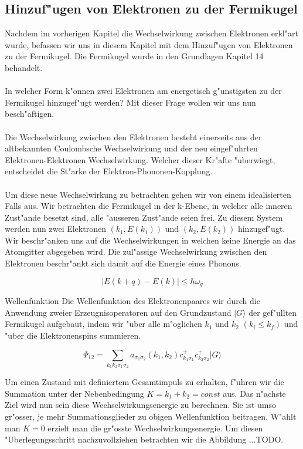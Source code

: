 \begin{refsection}
\section{Hinzuf"ugen von Elektronen zu der Fermikugel}
Nachdem im vorherigen Kapitel die Wechselwirkung zwischen Elektronen erkl"art wurde, befassen wir uns in diesem Kapitel mit dem Hinzuf"ugen von Elektronen zu der Fermikugel. Die Fermikugel wurde in den Grundlagen Kapitel 14 behandelt.
\\
\\
In welcher Form k"onnen zwei Elektronen am energetisch g"unstigsten zu der Fermikugel hinzugef"ugt werden? Mit dieser Frage wollen wir uns nun besch"aftigen.
\\
\\
Die Wechselwirkung zwischen den Elektronen besteht einerseits aus der altbekannten Coulombsche Wechselwirkung und der neu eingef"uhrten Elektronen-Elektronen Wechselwirkung. Welcher dieser Kr"afte "uberwiegt, entscheidet die St"arke der Elektron-Phononen-Kopplung.
\\
\\
Um diese neue Wechselwirkung zu betrachten gehen wir von einem idealisierten Falls aus. Wir betrachten die Fermikugel in der k-Ebene, in welcher alle inneren Zust"ande besetzt sind, alle "ausseren Zust"ande seien frei. Zu diesem System werden nun zwei Elektronen $(k_1,E(k_1))$ und $(k_2,E(k_2))$ hinzugef"ugt. Wir beschr"anken uns auf die Wechselwirkungen in welchen keine Energie an das Atomgitter abgegeben wird. Die zul"assige Wechselwirkung zwischen den Elektronen beschr"ankt sich damit auf die Energie eines Phonons.

\[
|E(k+q)-E(k)|\le\hbar\omega_q
\]

Wellenfunktion
Die Wellenfunktion des Elektronenpaares wir durch die Anwendung zweier Erzeugnisoperatoren auf den Grundzustand $|G\rangle$ der gef"ullten Fermikugel aufgebaut, indem wir "uber alle m"oglichen $k_1$ und $k_2$ $(k_i \le k_f)$ und "uber die Elektronenspins summieren.

\[
\Psi_{12}=\sum \limits_{k_1k_2\sigma_1\sigma_2} a_{\sigma_1\sigma_2}(k_1,k_2)c^+_{k_1\sigma_1}c^+_{k_2\sigma_2}|G\rangle
\]

Um einen Zustand mit definiertem Gesamtimpuls zu erhalten, f"uhren wir die Summation unter der Nebenbedingung $K=k_1+k_2=const$ aus.
Das n"achste Ziel wird nun sein diese Wechselwirkungsenergie zu berechnen. Sie ist umso gr"osser, je mehr Summationsglieder zu obigen Wellenfunktion beitragen. W"ahlt man $K=0$ erzielt man die gr"osste Wechselwirkungsenergie. Um diesen "Uberlegungsschritt nachzuvollziehen betrachten wir die Abbildung ...TODO.
 

\end{refsection}
